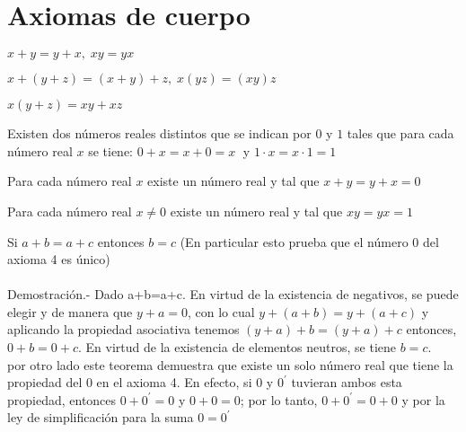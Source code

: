 \section{Axiomas de cuerpo}
\begin{tcolorbox}[colframe=white]
\begin{axioma} $x+y=y+x, \; xy=yx$\\
\end{axioma}

\begin{axioma} $x+(y+z)=(x+y)+z, \; x(yz)=(xy)z$ \\
\end{axioma}

\begin{axioma} $x(y+z)=xy+xz$ \\
\end{axioma}

\begin{axioma} Existen dos números reales distintos que se indican por $0$ y $1$ tales que para cada número real $x$ se tiene:
$0+x=x+0=x \;$ y $1\cdot x = x\cdot 1 = 1$ \\
\end{axioma}

\begin{axioma} Para cada número real $x$ existe un número real y tal que $x+y=y+x=0$ \\
\end{axioma}

\begin{axioma} Para cada número real $x\neq 0$ existe un número real y tal que $xy=yx=1$ \\
\end{axioma}
\end{tcolorbox}

\begin{teo}
Si $a+b=a+c$ entonces $b=c$ (En particular esto prueba que el número 0 del axioma 4 es único)\\\\
Demostración.- \;
Dado a+b=a+c. En virtud de la existencia de negativos, se puede elegir y de manera que $y+a=0$, con lo cual $y+(a+b)=y+(a+c)$ y aplicando la propiedad asociativa tenemos $(y+a)+b=(y+a)+c$ entonces, $0+b=0+c$. En virtud de la existencia de elementos neutros, se tiene $b=c$.\\
por otro lado este teorema demuestra que existe un solo número real que tiene la propiedad del 0 en el axioma 4. En efecto, si $0$ y $0^{'}$ tuvieran ambos esta propiedad, entonces $0+0^{'}=0$ y $0+0=0$; por lo tanto, $0+0^{'}=0+0$ y por la ley de simplificación para la suma $0=0^{'}$\\\\
\end{teo}

